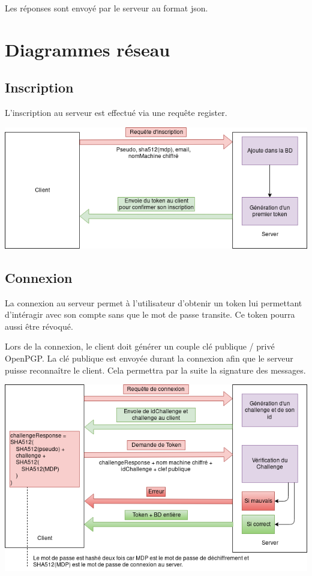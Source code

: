 \documentclass[oneside]{report}
\begin{document}
	\par Les réponses sont envoyé par le serveur au format json.\\

	\chapter{Diagrammes réseau}
	\vspace{2cm}
	\section{Inscription}{
		\par L'inscription au serveur est effectué via une requête register.\\
		\vspace{.5cm}
		\begin{center}
			\includegraphics[scale=.5]{reseau_register}
		\end{center}
	}

	\section{Connexion}{
		\par La connexion au serveur permet à l'utilisateur d'obtenir un token lui permettant d'intéragir avec son compte sans que le mot de passe transite. Ce token pourra aussi être révoqué.\\
		\par Lors de la connexion, le client doit générer un couple clé publique / privé OpenPGP. La clé publique est envoyée durant la connexion afin que le serveur puisse reconnaître le client. Cela permettra par la suite la signature des messages.
		\vspace{.5cm}
		\begin{center}
			\includegraphics[scale=.5]{reseau_connexion}
		\end{center}
	}
\end{document}
